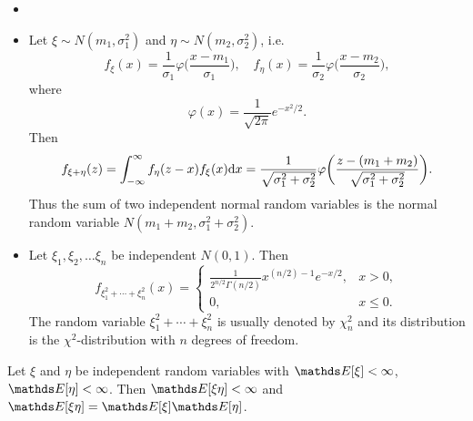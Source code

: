 \begin{example}
\begin{itemize}
    \item[]
    \item Let $\xi \sim N(m_1,\sigma_1^2)$ and $\eta \sim N(m_2,\sigma_2^2)$, i.e.
    \begin{equation*}
        f_\xi(x) = \frac{1}{\sigma_1}\varphi\bigg(\frac{x-m_1}{\sigma_1} \bigg), \quad f_\eta(x) = \frac{1}{\sigma_2}\varphi\bigg(\frac{x-m_2}{\sigma_2} \bigg),
    \end{equation*}
    where
    \begin{equation*}
        \varphi(x) = \frac{1}{\sqrt{2\pi}}e^{-x^2/2}.
    \end{equation*}
    Then
    \begin{equation*}
        f_{\xi + \eta}(z) = \int_{-\infty}^\infty f_{\eta}(z-x)f_\xi(x)\mathrm{d} x = \frac{1}{\sqrt{\sigma_1^2 + \sigma_2^2}}\varphi \bigg( \frac{z - (m_1 + m_2)}{\sqrt{\sigma_1^2+\sigma_2^2}} \bigg).
    \end{equation*}
    Thus the sum of two independent normal random variables is the normal random variable $N(m_1 + m_2, \sigma_1^2 + \sigma_2^2)$. 
    \item Let $\xi_1, \xi_2, \dots \xi_n$ be independent $N(0,1)$. Then
    \begin{equation*}
        f_{\xi_1^2 + \cdots + \xi_n^2}(x) = 
        \begin{cases}
         \frac{1}{2^{n/2}\Gamma(n/2)}x^{(n/2)-1}e^{-x/2}, & x>0,\\
         0, &x\le 0.
        \end{cases}
    \end{equation*}
    The random variable $\xi_1^2 + \cdots + \xi_n^2$ is usually denoted by $\chi_n^2$ and its distribution is the $\chi^2$-distribution with $n$ degrees of freedom.
\end{itemize}
\end{example}

\begin{proposition}
Let $\xi$ and $\eta$ be independent random variables with $\E[\xi]<\infty$, $\E[\eta] < \infty$. Then $\E[\xi \eta] < \infty$ and $\E[\xi \eta] = \E[\xi] \E[\eta]$.
\end{proposition}

